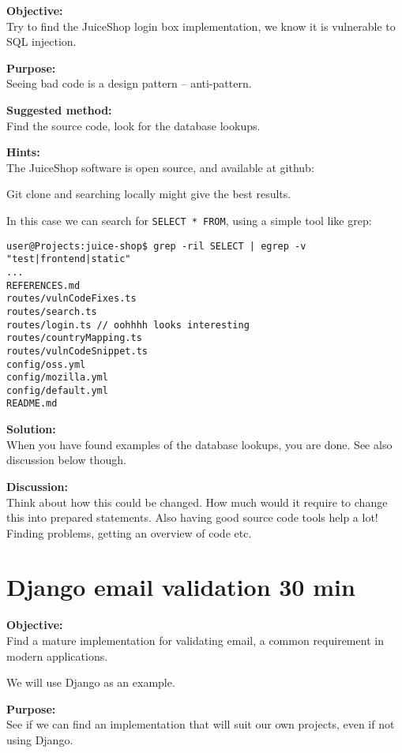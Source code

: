 \documentclass[a4paper,11pt,notitlepage]{report}
\begin{document}
{\bf Objective:}\\
Try to find the JuiceShop login box implementation, we know it is vulnerable to SQL injection.


{\bf Purpose:}\\
Seeing bad code is a design pattern -- anti-pattern.


{\bf Suggested method:}\\
Find the source code, look for the database lookups.


{\bf Hints:}\\
The JuiceShop software is open source, and available at github:\\

Git clone and searching locally might give the best results.

In this case we can search for \verb+SELECT * FROM+, using a simple tool like grep:

\begin{verbatim}
user@Projects:juice-shop$ grep -ril SELECT | egrep -v "test|frontend|static"
...
REFERENCES.md
routes/vulnCodeFixes.ts
routes/search.ts
routes/login.ts // oohhhh looks interesting
routes/countryMapping.ts
routes/vulnCodeSnippet.ts
config/oss.yml
config/mozilla.yml
config/default.yml
README.md
\end{verbatim}


{\bf Solution:}\\
When you have found examples of the database lookups, you are done. See also discussion below though.


{\bf Discussion:}\\
Think about how this could be changed. How much would it require to change this into prepared statements.
Also having good source code tools help a lot! Finding problems, getting an overview of code etc.



\chapter{Django email validation 30 min}
\label{ex:django-email}



{\bf Objective:}\\
Find a mature implementation for validating email, a common requirement in modern applications.

We will use Django as an example.

{\bf Purpose:}\\
See if we can find an implementation that will suit our own projects, even if not using Django.
\end{document}
